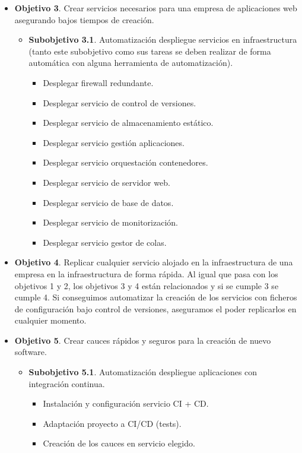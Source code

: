 \begin{text}
\begin{itemize}
				\item \textbf{Objetivo 3}. Crear servicios necesarios para una empresa de aplicaciones web asegurando bajos tiempos de creación.
				\begin{itemize}
					\item \textbf{Subobjetivo 3.1}. Automatización despliegue servicios en infraestructura (tanto este subobjetivo como sus tareas se deben realizar de forma automática con alguna herramienta de automatización).
					\begin{itemize}
						\item Desplegar firewall redundante.
						\item Desplegar servicio de control de versiones.
						\item Desplegar servicio de almacenamiento estático.
						\item Desplegar servicio gestión aplicaciones.
						\item Desplegar servicio orquestación contenedores.
						\item Desplegar servicio de servidor web.
						\item Desplegar servicio de base de datos.
						\item Desplegar servicio de monitorización.
						\item Desplegar servicio gestor de colas.
					\end{itemize}
				\end{itemize}
				\item \textbf{Objetivo 4}. Replicar cualquier servicio alojado en la infraestructura de una empresa en la infraestructura de forma rápida. Al igual que pasa con los objetivos 1 y 2, los objetivos 3 y 4 están relacionados y si se cumple 3 se cumple 4. Si conseguimos automatizar la creación de los servicios con ficheros de configuración bajo control de versiones, aseguramos el poder replicarlos en cualquier momento.
				\item \textbf{Objetivo 5}. Crear cauces rápidos y seguros para la creación de nuevo software.
				\begin{itemize}
					\item \textbf{Subobjetivo 5.1}. Automatización despliegue aplicaciones con integración continua.
					\begin{itemize}
						\item Instalación y configuración servicio CI + CD.
						\item Adaptación proyecto a CI/CD (tests).
						\item Creación de los cauces en servicio elegido.
					\end{itemize}
				\end{itemize}
			\end{itemize}
		\end{text}
	
